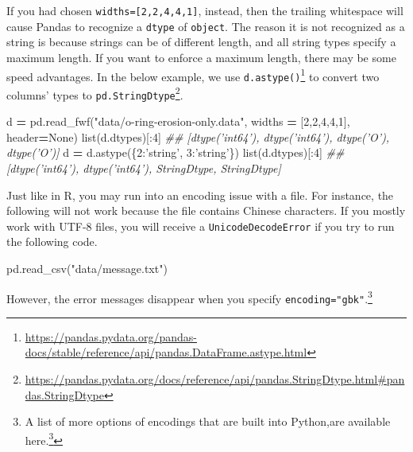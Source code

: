 \documentclass[12pt,krantz2]{krantz}
\makeatletter
\newenvironment{Shaded}{\begin{snugshade}}{\end{snugshade}}
\newcommand{\BuiltInTok}[1]{#1}
\newcommand{\CommentTok}[1]{\textcolor[rgb]{0.37,0.37,0.37}{\textit{#1}}}
\newcommand{\DecValTok}[1]{\textcolor[rgb]{0.06,0.06,0.06}{#1}}
\newcommand{\NormalTok}[1]{#1}
\newcommand{\OperatorTok}[1]{\textcolor[rgb]{0.43,0.43,0.43}{\textbf{#1}}}
\newcommand{\StringTok}[1]{\textcolor[rgb]{0.5,0.5,0.5}{#1}}
\newcommand{\VariableTok}[1]{\textcolor[rgb]{0,0,0}{#1}}
\renewcommand{\href}[2]{#2\footnote{\url{#1}}}
\newenvironment{kframe}{%
\medskip{}
\setlength{\fboxsep}{.8em}
 \def\at@end@of@kframe{}%
 \ifinner\ifhmode%
  \def\at@end@of@kframe{\end{minipage}}%
  \begin{minipage}{\columnwidth}%
 \fi\fi%
 \def\FrameCommand##1{\hskip\@totalleftmargin \hskip-\fboxsep
 \colorbox{shadecolor}{##1}\hskip-\fboxsep
     \hskip-\linewidth \hskip-\@totalleftmargin \hskip\columnwidth}%
 \MakeFramed {\advance\hsize-\width
   \@totalleftmargin\z@ \linewidth\hsize
   \@setminipage}}%
 {\par\unskip\endMakeFramed%
 \at@end@of@kframe}
\renewenvironment{Shaded}{\begin{kframe}}{\end{kframe}}
\makeatother
\begin{document}
If you had chosen \texttt{widths={[}2,2,4,4,1{]}}, instead, then the trailing whitespace will cause Pandas to recognize a \texttt{dtype} of \texttt{object}. The reason it is not recognized as a string is because strings can be of different length, and all string types specify a maximum length. If you want to enforce a maximum length, there may be some speed advantages. In the below example, we use \href{https://pandas.pydata.org/pandas-docs/stable/reference/api/pandas.DataFrame.astype.html}{\texttt{d.astype()}} to convert two columns' types to \href{https://pandas.pydata.org/docs/reference/api/pandas.StringDtype.html\#pandas.StringDtype}{\texttt{pd.StringDtype}}.

\begin{Shaded}
\begin{Highlighting}[]
\NormalTok{d }\OperatorTok{=}\NormalTok{ pd.read_fwf(}\StringTok{"data/o-ring-erosion-only.data"}\NormalTok{, }
\NormalTok{                  widths }\OperatorTok{=}\NormalTok{ [}\DecValTok{2}\NormalTok{,}\DecValTok{2}\NormalTok{,}\DecValTok{4}\NormalTok{,}\DecValTok{4}\NormalTok{,}\DecValTok{1}\NormalTok{], header}\OperatorTok{=}\VariableTok{None}\NormalTok{)}
\BuiltInTok{list}\NormalTok{(d.dtypes)[:}\DecValTok{4}\NormalTok{]}
\CommentTok{## [dtype('int64'), dtype('int64'), dtype('O'), dtype('O')]}
\NormalTok{d }\OperatorTok{=}\NormalTok{ d.astype(\{}\DecValTok{2}\NormalTok{:}\StringTok{'string'}\NormalTok{, }\DecValTok{3}\NormalTok{:}\StringTok{'string'}\NormalTok{\}) }
\BuiltInTok{list}\NormalTok{(d.dtypes)[:}\DecValTok{4}\NormalTok{]}
\CommentTok{## [dtype('int64'), dtype('int64'), StringDtype, StringDtype]}
\end{Highlighting}
\end{Shaded}

Just like in R, you may run into an encoding issue with a file. For instance, the following will not work because the file contains Chinese characters. If you mostly work with UTF-8 files, you will receive a \texttt{UnicodeDecodeError} if you try to run the following code.

\begin{Shaded}
\begin{Highlighting}[]
\NormalTok{pd.read_csv(}\StringTok{"data/message.txt"}\NormalTok{)}
\end{Highlighting}
\end{Shaded}

However, the error messages disappear when you specify \texttt{encoding="gbk"}.\footnote{A list of more options of encodings that are built into Python,are available \href{https://docs.python.org/3/library/codecs.html\#standard-encodings}{here.}}
\end{document}
